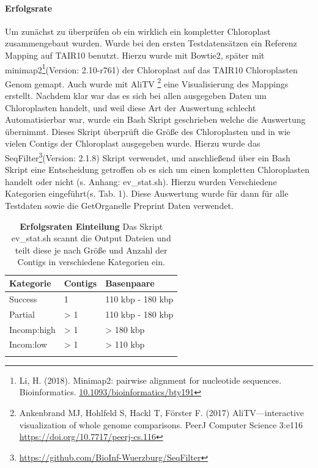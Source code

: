 \documentclass{scrartcl}
\begin{document}
\paragraph{Erfolgsrate}
\label{sec-3-1-2-2}
Um zunächst zu überprüfen ob ein wirklich ein kompletter Chloroplast zusammengebaut wurden. Wurde bei den ersten Testdatensätzen ein Referenz Mapping auf
TAIR10 benutzt. Hierzu wurde mit Bowtie2, später mit minimap2\footnote{Li, H. (2018). Minimap2: pairwise alignment for nucleotide sequences. Bioinformatics. \url{10.1093/bioinformatics/bty191}}(Version: 2.10-r761)  der Chloroplast auf das TAIR10 Chloroplasten Genom gemapt. Auch wurde mit AliTV \footnote{Ankenbrand MJ, Hohlfeld S, Hackl T, Förster F. (2017) AliTV—interactive visualization of whole genome comparisons. PeerJ Computer Science 3:e116 \url{https://doi.org/10.7717/peerj-cs.116}} 
eine Visualisierung des Mappings erstellt. Nachdem klar war das es sich bei allen ausgegeben Daten um Chloroplasten handelt, und weil diese Art der 
Auswertung schlecht Automatisierbar war, wurde ein Bash Skript geschrieben welche die Auswertung übernimmt. Dieses Skript überprüft die Größe des
Chloroplasten und in wie vielen Contigs der Chloroplast ausgegeben wurde. Hierzu wurde das SeqFilter\footnote{\url{https://github.com/BioInf-Wuerzburg/SeqFilter}}(Version: 2.1.8) Skript verwendet, und anschließend über ein Bash
Skript eine Entscheidung getroffen ob es sich um einen kompletten Chloroplasten handelt oder nicht (s. Anhang: ev\_stat.sh). Hierzu wurden Verschiedene
Kategorien eingeführt(s. Tab. 1). Diese Auswertung wurde für dann für alle Testdaten sowie die GetOrganelle Preprint Daten verwendet.
\begin{table}[!h]
\caption[Erfolgsraten Einteilung]{\textbf{Erfolgsraten Einteilung} Das Skript ev\_stat.sh scannt die Output Dateien und teilt diese je nach Größe und Anzahl der Contigs in verschiedene Kategorien ein. }
\begin{center}
\begin{tabular}{lll}
Kategorie & Contigs & Basenpaare\\
\hline
Success & 1 & 110 kbp - 180 kbp\\
Partial & > 1 & 110 kbp - 180 kbp\\
Incomp:high & > 1 & > 180 kbp\\
Incom:low & > 1 & > 110 kbp\\
 &  & \\
\end{tabular}
\end{center}
\end{table}
\end{document}

